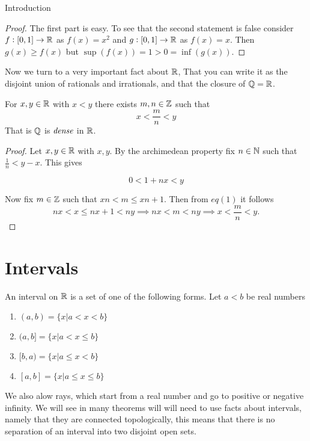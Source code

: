 \begin{chapter}{Introduction}
    
    \begin{proof}
        The first part is easy. To see that the second statement is false consider $f:[0,1] \to \mathbb{R}$ as $f(x) = x^2$ and 
        $g: [0, 1] \to \mathbb{R}$ as $f(x) = x$. Then $g(x) \geq f(x)$ but $\sup(f(x)) = 1 > 0 = \inf(g(x))$. 
    \end{proof}


    Now we turn to a very important fact about $\mathbb{R}$, That you can write it as the disjoint union of rationals and irrationals, and 
    that the closure of $\mathbb{Q} = \mathbb{R}$. 

    
    \begin{thm}
        For $x, y \in \mathbb{R}$ with $x < y$ there exists $m, n \in \mathbb{Z}$ such that 
        \[x < \frac{m}{n} < y\]
        That is $\mathbb{Q}$ is $\emph{dense}$ in $\mathbb{R}$. 
    \end{thm}

    
    \begin{proof}
        Let $x, y \in \mathbb{R}$ with $x , y$. By the archimedean property fix $n \in \mathbb{N}$ such that $\frac{1}{n} < y - x$. This gives 
        
        \[0 < 1 + nx < y \] 

        Now fix $m \in \mathbb{Z}$ such that $xn < m \leq xn + 1$. Then from $eq(1)$ it follows 
        \[nx< x \leq nx + 1 < ny \implies nx < m < ny \implies x < \frac{m}{n} < y. \]

    \end{proof}

    \section{Intervals}

    
    \begin{defn}
        An interval on $\mathbb{R}$ is a set of one of the following forms. Let $a < b$ be real numbers 
        
        \begin{enumerate}
            \item $(a, b) = \{x | a < x < b\}$ 
            \item $(a, b] = \{x | a < x \leq b\}$ 
            \item $[b, a ) = \{x | a \leq x < b\}$ 
            \item $[a, b] = \{x | a \leq x \leq b \}$ 
        \end{enumerate}
    \end{defn}


    We also alow rays, which start from a real number and go to positive or negative infinity. We will see in many theorems will 
    will need to use facts about intervals, namely that they are connected topologically, this means that there is no separation of 
    an interval into two disjoint open sets. 


\end{chapter}

